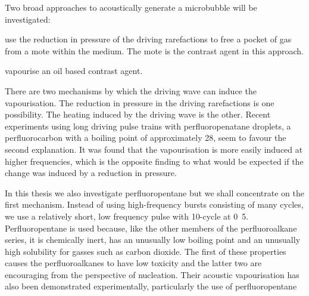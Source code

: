 Two broad approaches to acoustically generate a microbubble will be investigated:
\nlist
{
\item use the reduction in pressure of the driving rarefactions to free a pocket of gas from a mote within the medium.
The mote is the contrast agent in this approach.
\item vapourise an oil based contrast agent.  

There are two mechanisms by which the driving wave can induce the vapourisation.
The reduction in pressure in the driving rarefactions is one possibility.
The heating induced by the driving wave is the other.
Recent experiments using long driving pulse trains with perfluoropenatane droplets,
a perfluorocarbon with a boiling point of approximately 28\degree\cite{}, 
seem to favour the second explanation\cite{Burns2010}.
It was found that the vapourisation is more easily induced at higher frequencies\cite{Burns2010},
which is the opposite finding to what would be expected if the change was induced by a reduction in pressure. 

In this thesis we also investigate perfluoropentane but we shall concentrate on the first mechanism.
Instead of using high-frequency bursts consisting of many cycles,
we use a relatively short, low frequency pulse with 10-cycle at \unit{0.5}\mega\pascal.
Perfluoropentane is used because, like the other members of the perfluoroalkane series,
it is chemically inert, has an unusually low boiling point and an unusually high solubility for gasses such as carbon dioxide.
The first of these properties causes the perfluoroalkanes to have low toxicity
and the latter two are encouraging from the perspective of nucleation.
Their acoustic vapourisation has also been demonstrated experimentally,
particularly the use of perfluoropentane\cite{Kripfgans2000,Rapoport2007}
}






